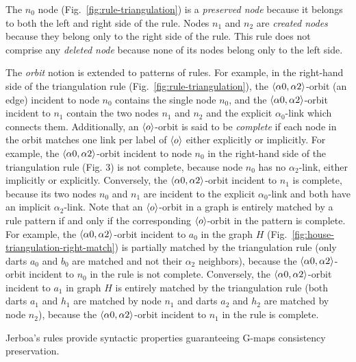 The $n_0$ node (Fig.~\ref{fig:rule-triangulation}) is a \emph{preserved node} because it belongs to both the left and right side of the rule.
Nodes $n_1$ and $n_2$ are \emph{created nodes} because they belong only to the right side of the rule.
This rule does not comprise any \emph{deleted node} because none of its nodes belong only to the left side.

The \emph{orbit} notion is extended to patterns of rules.
For example, in the right-hand side of the triangulation rule (Fig.~\ref{fig:rule-triangulation}), the $\langle\alpha 0, \alpha 2\rangle$-orbit (an edge) incident to node $n_{0}$ contains the single node $n_0$, and the $\langle\alpha 0, \alpha 2\rangle$-orbit incident to $n_1$ contain the two nodes $n_1$ and $n_2$ and the explicit $\alpha_0$-link which connects them.
Additionally, an $\langle o\rangle$-orbit is said to be \emph{complete} if each node in the orbit matches one link per label of $\langle o\rangle$ either explicitly or implicitly.
For example, the $\langle\alpha 0, \alpha 2\rangle$-orbit incident to node $n_{0}$ in the right-hand side of the triangulation rule (Fig. 3) is not complete, because node $n_0$ has no $\alpha_2$-link, either implicitly or explicitly.
Conversely, the $\langle\alpha 0, \alpha 2\rangle$-orbit incident to $n_1$ is complete, because its two nodes $n_0$ and $n_1$ are incident to the explicit $\alpha_0$-link and both have an implicit $\alpha_2$-link.
Note that an $\langle o\rangle$-orbit in a graph is entirely matched by a rule pattern if and only if the corresponding $\langle o\rangle$-orbit in the pattern is complete.
For example, the $\langle\alpha 0, \alpha 2\rangle$-orbit incident to $a_0$ in the graph $H$ (Fig.~\ref{fig:house-triangulation-right-match}) is partially matched by the triangulation rule (only darts $a_0$ and $b_0$ are matched and not their $\alpha_2$ neighbors), because the $\langle\alpha 0, \alpha 2\rangle$-orbit incident to $n_0$ in the rule is not complete.
Conversely, the $\langle\alpha 0, \alpha 2\rangle$-orbit incident to $a_1$ in graph $H$ is entirely matched by the triangulation rule (both darts $a_1$ and $h_1$ are matched by node $n_1$ and darts $a_2$ and $h_2$ are matched by  node $n_2$), because the $\langle\alpha 0, \alpha 2\rangle$-orbit incident to $n_1$ in the rule is complete.

Jerboa's rules provide syntactic properties guaranteeing G-maps consistency preservation.

